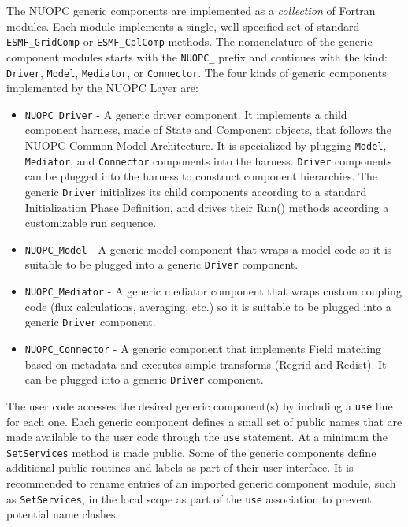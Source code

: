 
The NUOPC generic components are implemented as a {\em collection} of Fortran modules. Each module implements a single, well specified set of standard {\tt ESMF\_GridComp} or {\tt ESMF\_CplComp} methods. The nomenclature of the generic component modules starts with the {\tt NUOPC\_} prefix and continues with the kind: {\tt Driver}, {\tt Model}, {\tt Mediator}, or {\tt Connector}. The four kinds of generic components implemented by the NUOPC Layer are:

\begin{itemize}

\item {\tt NUOPC\_Driver} - A generic driver component. It implements a child component harness, made of State and Component objects, that follows the NUOPC Common Model Architecture. It is specialized by plugging {\tt Model}, {\tt Mediator}, and {\tt Connector} components into the harness. {\tt Driver} components can be plugged into the harness to construct component hierarchies. The generic {\tt Driver} initializes its child components according to a standard Initialization Phase Definition, and drives their Run() methods according a customizable run sequence.

\item {\tt NUOPC\_Model} - A generic model component that wraps a model code so it is suitable to be plugged into a generic {\tt Driver} component.

\item {\tt NUOPC\_Mediator} - A generic mediator component that wraps custom coupling code (flux calculations, averaging, etc.) so it is suitable to be plugged into a generic {\tt Driver} component.

\item {\tt NUOPC\_Connector} - A generic component that implements Field matching based on metadata and executes simple transforms (Regrid and Redist). It can be plugged into a generic {\tt Driver} component.

\end{itemize}

The user code accesses the desired generic component(s) by including a {\tt use} line for each one. Each generic component defines a small set of public names that are made available to the user code through the {\tt use} statement. At a minimum the {\tt SetServices} method is made public. Some of the generic components define additional public routines and labels as part of their user interface. It is recommended to rename entries of an imported generic component module, such as {\tt SetServices}, in the local scope as part of the {\tt use} association to prevent potential name clashes.

